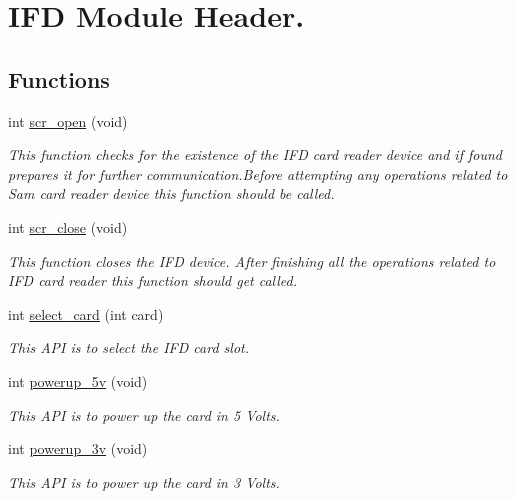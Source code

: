 \hypertarget{group__E}{\section{I\+F\+D Module Header.}
\label{group__E}
}
\subsection*{Functions}
\begin{DoxyCompactItemize}
\item 
int \hyperlink{group__E_ga7a152ac6f3b7d07e496997925dbbab61}{scr\+\_\+open} (void)
\begin{DoxyCompactList}\small\item\em This function checks for the existence of the I\+F\+D card reader device and if found prepares it for further communication.\+Before attempting any operations related to Sam card reader device this function should be called. \end{DoxyCompactList}\item 
int \hyperlink{group__E_ga2734d3bcd5ff6a9c49be31c325604eab}{scr\+\_\+close} (void)
\begin{DoxyCompactList}\small\item\em This function closes the I\+F\+D device. After finishing all the operations related to I\+F\+D card reader this function should get called. \end{DoxyCompactList}\item 
int \hyperlink{group__E_gadd96a82bc4b780133bb337333bed762b}{select\+\_\+card} (int card)
\begin{DoxyCompactList}\small\item\em This A\+P\+I is to select the I\+F\+D card slot. \end{DoxyCompactList}\item 
int \hyperlink{group__E_ga1b464bff1a79bbf4fdfd249cf102d331}{powerup\+\_\+5v} (void)
\begin{DoxyCompactList}\small\item\em This A\+P\+I is to power up the card in 5 Volts. \end{DoxyCompactList}\item 
int \hyperlink{group__E_ga879f3cf7a6460262c1976f9a7273f74e}{powerup\+\_\+3v} (void)
\begin{DoxyCompactList}\small\item\em This A\+P\+I is to power up the card in 3 Volts. \end{DoxyCompactList}\item 

\end{DoxyCompactItemize}
